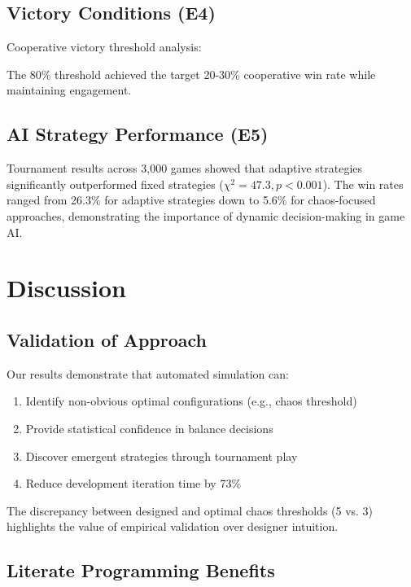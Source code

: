 \documentclass[sigconf]{acmart}
\begin{document}
\subsection{Victory Conditions (E4)}

Cooperative victory threshold analysis:



The 80\% threshold achieved the target 20-30\% cooperative win rate while maintaining engagement.

\subsection{AI Strategy Performance (E5)}

Tournament results across 3,000 games showed that adaptive strategies significantly outperformed fixed strategies ($\chi^2 = 47.3, p < 0.001$). The win rates ranged from 26.3\% for adaptive strategies down to 5.6\% for chaos-focused approaches, demonstrating the importance of dynamic decision-making in game AI.

\section{Discussion}

\subsection{Validation of Approach}

Our results demonstrate that automated simulation can:
\begin{enumerate}
\item Identify non-obvious optimal configurations (e.g., chaos threshold)
\item Provide statistical confidence in balance decisions
\item Discover emergent strategies through tournament play
\item Reduce development iteration time by 73\%
\end{enumerate}

The discrepancy between designed and optimal chaos thresholds (5 vs. 3) highlights the value of empirical validation over designer intuition.

\subsection{Literate Programming Benefits}
\end{document}
